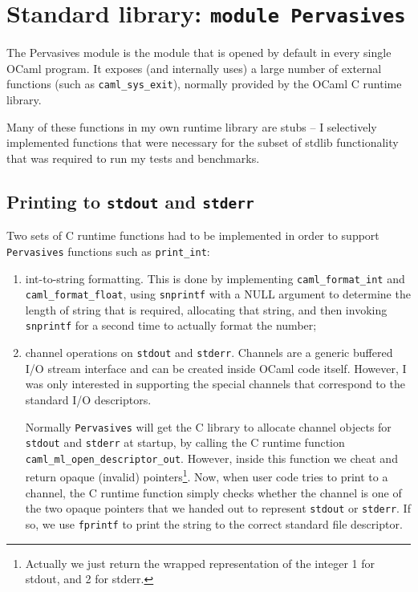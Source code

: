 \documentclass[12pt,a4paper,twoside,openright]{report}
\begin{document}
\section{Standard library: \texttt{module Pervasives}}\label{pervasives}

The Pervasives module is the module that is opened by default in every single OCaml program. It exposes (and internally uses) a large number of external
functions (such as \lstinline!caml_sys_exit!), normally
provided by the OCaml C runtime library.

Many of these functions in my own runtime library are stubs -- I selectively
implemented functions that were necessary for the subset of
stdlib functionality that was required to run my tests and benchmarks.

\subsection{Printing to \texttt{stdout} and \texttt{stderr}}\label{pervasives-printing}

Two sets of C runtime functions had to be implemented in order to support
\lstinline!Pervasives! functions such as \lstinline!print_int!:
\begin{enumerate}
  \item int-to-string formatting. This is done by implementing
    \lstinline!caml_format_int! and \lstinline!caml_format_float!, using
    \lstinline!snprintf! with a NULL argument to determine the length of string
    that is required, allocating that string, and then invoking
    \lstinline!snprintf! for a second time to actually format the number;
  \item channel operations on \lstinline!stdout! and \lstinline!stderr!.
    Channels are a generic buffered I/O stream interface and can be created
    inside OCaml code itself. However, I was only interested in supporting the
    special channels that correspond to the standard I/O descriptors.

    Normally \lstinline!Pervasives! will get the C library to allocate channel
    objects for \lstinline!stdout! and \lstinline!stderr! at startup, by calling the C runtime function
    \lstinline!caml_ml_open_descriptor_out!. However,
    inside this function we cheat and return opaque (invalid)
    pointers\footnote{Actually we just return the wrapped representation of the integer 1
    for stdout, and 2 for stderr.}. Now, when user code tries to
    print to a channel, the C runtime function simply checks whether the channel is
    one of the two opaque pointers that we handed out to represent
    \lstinline!stdout! or \lstinline!stderr!. If so, we use \lstinline!fprintf!
    to print the string to the correct standard file descriptor.
\end{enumerate}
\end{document}

